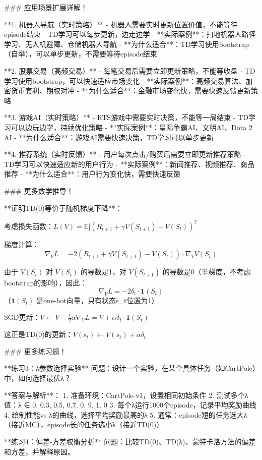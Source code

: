 ### 应用场景扩展详解！

**1. 机器人导航（实时策略）**
- 机器人需要实时更新位置价值，不能等待episode结束
- TD学习可以每步更新，边走边学
- **实际案例**：扫地机器人路径学习、无人机避障、仓储机器人导航
- **为什么适合**：TD学习使用bootstrap（自举），可以单步更新，不需要等待episode结束

**2. 股票交易（高频交易）**
- 每笔交易后需要立即更新策略，不能等收盘
- TD学习使用bootstrap，可以快速适应市场变化
- **实际案例**：高频交易算法、加密货币套利、期权对冲
- **为什么适合**：金融市场变化快，需要快速反馈更新策略

**3. 游戏AI（实时策略）**
- RTS游戏中需要实时决策，不能等一局结束
- TD学习可以边玩边学，持续优化策略
- **实际案例**：星际争霸AI、文明AI、Dota 2 AI
- **为什么适合**：游戏AI需要快速决策，TD学习可以单步更新

**4. 推荐系统（实时反馈）**
- 用户每次点击/购买后需要立即更新推荐策略
- TD学习可以快速适应新的用户行为
- **实际案例**：新闻推荐、视频推荐、商品推荐
- **为什么适合**：用户行为变化快，需要快速反馈

### 更多数学推导！

**证明TD(0)等价于随机梯度下降**：

考虑损失函数：$L(V) = \mathbb{E}[(R_{t+1} + \gamma V(S_{t+1}) - V(S_t))^2$

梯度计算：
$$ \nabla_V L = -2(R_{t+1} + \gamma V(S_{t+1}) - V(S_t)) \cdot \nabla_V V(S_t) $$

由于 $V(S_t)$ 对 $V(S_t)$ 的导数是1，对 $V(S_{t+1})$ 的导数是0（半梯度，不考虑bootstrap的影响），因此：
$$ \nabla_V L = -2\delta_t \cdot \mathbf{1}(S_t) $$
（$\mathbf{1}(S_t)$ 是one-hot向量，只有状态s_t位置为1）

SGD更新：$V \leftarrow V - \frac{1}{2} \alpha \nabla_V L = V + \alpha \delta_t \cdot \mathbf{1}(S_t)$

这正是TD(0)的更新：$V(s_t) \leftarrow V(s_t) + \alpha \delta_t$

### 更多练习题！

**练习3：λ参数选择实验**
问题：设计一个实验，在某个具体任务（如CartPole）中，如何选择最优λ？

**答案与解析**：
1. 准备环境：CartPole-v1，设置相同初始条件
2. 测试多个λ值：λ ∈ {0, 0.3, 0.5, 0.7, 0. 9, 1. 0}
3. 每个λ运行1000个episode，记录平均奖励曲线
4. 绘制性能vs λ的曲线，选择平均奖励最高的λ
5. 通常：episode短的任务选大λ（接近MC），episode长的任务选小λ（接近TD(0)）

**练习4：偏差-方差权衡分析**
问题：比较TD(0)、TD(λ)、蒙特卡洛方法的偏差和方差，并解释原因。

